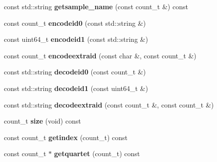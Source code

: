 \begin{DoxyCompactItemize}
\item 
\hypertarget{classmapfile_aa80fc1adfe42b336d2c1702cdde7ad51}{const std\-::string {\bfseries getsample\-\_\-name} (const count\-\_\-t \&) const }\label{classmapfile_aa80fc1adfe42b336d2c1702cdde7ad51}

\item 
\hypertarget{classmapfile_a1d134466af3a34acb60aede0ace71767}{const count\-\_\-t {\bfseries encodeid0} (const std\-::string \&)}\label{classmapfile_a1d134466af3a34acb60aede0ace71767}

\item 
\hypertarget{classmapfile_a56a2120940cbd2dd3ab524d3f46bcb1d}{const uint64\-\_\-t {\bfseries encodeid1} (const std\-::string \&)}\label{classmapfile_a56a2120940cbd2dd3ab524d3f46bcb1d}

\item 
\hypertarget{classmapfile_a4d480418ad85f77d022b811d65b8de03}{const count\-\_\-t {\bfseries encodeextraid} (const char \&, const count\-\_\-t \&)}\label{classmapfile_a4d480418ad85f77d022b811d65b8de03}

\item 
\hypertarget{classmapfile_a1da73c7dd6e0e9a3a511d2bf11a5b201}{const std\-::string {\bfseries decodeid0} (const count\-\_\-t \&)}\label{classmapfile_a1da73c7dd6e0e9a3a511d2bf11a5b201}

\item 
\hypertarget{classmapfile_a6934357003693e5daffd0f56b67bcb6a}{const std\-::string {\bfseries decodeid1} (const uint64\-\_\-t \&)}\label{classmapfile_a6934357003693e5daffd0f56b67bcb6a}

\item 
\hypertarget{classmapfile_aff2847780a1c492cde933881cdb2f303}{const std\-::string {\bfseries decodeextraid} (const count\-\_\-t \&, const count\-\_\-t \&)}\label{classmapfile_aff2847780a1c492cde933881cdb2f303}

\item 
\hypertarget{classmapfile_a053a86aaefb8d67c82a3f9d9ba283eaf}{count\-\_\-t {\bfseries size} (void) const }\label{classmapfile_a053a86aaefb8d67c82a3f9d9ba283eaf}

\item 
\hypertarget{classmapfile_a26747a613179e1402cc8b97567f8df6e}{const count\-\_\-t {\bfseries getindex} (count\-\_\-t) const }\label{classmapfile_a26747a613179e1402cc8b97567f8df6e}

\item 
\hypertarget{classmapfile_aaf445cb55b51d8f9da1fc9c1bdeeb1f9}{const count\-\_\-t $\ast$ {\bfseries getquartet} (count\-\_\-t) const }\label{classmapfile_aaf445cb55b51d8f9da1fc9c1bdeeb1f9}


\end{DoxyCompactItemize}
